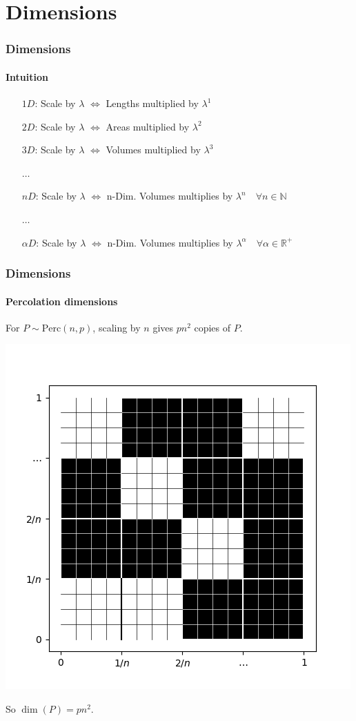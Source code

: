 \documentclass{beamer}
\newcommand{\perc}[2]{\text{Perc}\left( #1, #2 \right)}
\newcommand{\N}{\mathbb{N}}
\newcommand{\R}{\mathbb{R}}
\begin{document}
	
	\section{Dimensions}
	\begin{frame}
		\frametitle{Dimensions}
		\framesubtitle{Intuition}
		\begin{itemize}
			\pause
			\item[$1D$:] Scale by $\lambda$ $\iff$ Lengths multiplied by $\lambda^1$
			\pause
			\item[$2D$:] Scale by $\lambda$ $\iff$ Areas multiplied by $\lambda^2$
			\pause
			\item[$3D$:] Scale by $\lambda$ $\iff$ Volumes multiplied by $\lambda^3$
			\pause
			\item[$\dots$]
			\item[$nD$:] Scale by $\lambda$ $\iff$ n-Dim. Volumes multiplies by $\lambda^n \quad \forall n \in \N$
			\pause
			\item[\color{purple} $\dots$]
			\item[\color{red} $\alpha D$:] \color{brickred} Scale by $\lambda$ $\iff$ n-Dim. Volumes multiplies by $\lambda^{\alpha} \quad \forall \alpha \in \R^+$
		\end{itemize}
	\end{frame}
	\begin{frame}
		\frametitle{Dimensions}
		\framesubtitle{Percolation dimensions}
		For $P \sim \perc{n}{p}$, scaling by $n$ gives $pn^2$ copies of $P$.
		\begin{center}
			\includegraphics[scale=0.4]{imgs/perc_fig2.png}
		\end{center}
		So $\dim(P) = pn^2$.
		
	\end{frame}
	
\end{document}
